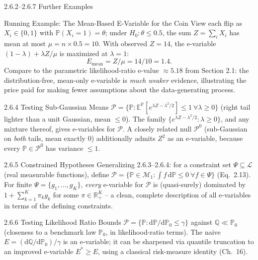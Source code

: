 \documentclass[aspectratio=169,10pt]{beamer}
\newcommand{\PP}{\mathbb{P}}
\newcommand{\QQ}{\mathbb{Q}}
\newcommand{\EE}{\mathbb{E}}
\newcommand{\RR}{\mathbb{R}}
\newcommand{\calP}{\mathcal{P}}
\begin{document}
\begin{frame}[allowframebreaks]{2.6.2--2.6.7 Further Examples}
  \begin{exampleblock}{Running Example: The Mean-Based E-Variable for the Coin}
    View each flip as $X_i\in\{0,1\}$ with $\PP(X_i=1)=\theta$; under
    $H_0:\theta\le0.5$, the sum $Z=\sum_i X_i$ has mean at most
    $\mu = n\times0.5 = 10$. With observed $Z=14$, the e-variable
    $(1-\lambda)+\lambda Z/\mu$ is maximized at $\lambda=1$:
    \[
      E_{\text{mean}} = Z/\mu = 14/10 = 1.4.
    \]
    Compare to the parametric likelihood-ratio e-value $\approx5.18$ from
    Section 2.1: the distribution-free, mean-only e-variable is
    \emph{much weaker} evidence, illustrating the price paid for making
    fewer assumptions about the data-generating process.
  \end{exampleblock}

  \framebreak

  \begin{block}{2.6.4 Testing Sub-Gaussian Means}
    $\calP = \{\PP: \EE^\PP[e^{\lambda Z-\lambda^2/2}]\le1 \ \forall \lambda\ge0\}$
    (right tail lighter than a unit Gaussian, mean $\le0$). The family
    $\{e^{\lambda Z-\lambda^2/2}:\lambda\ge0\}$, and any mixture thereof,
    gives e-variables for $\calP$. A closely related null $\calP^0$
    (sub-Gaussian on \emph{both} tails, mean exactly 0) additionally admits
    $Z^2$ as an e-variable, because every $\PP\in\calP^0$ has variance
    $\le1$.
  \end{block}

  \begin{block}{2.6.5 Constrained Hypotheses}
    Generalizing 2.6.3--2.6.4: for a constraint set $\Psi\subseteq\mathcal{L}$
    (real measurable functions), define
    $\calP = \{\PP\in\mathcal{M}_1: \int f\,\mathrm{d}\PP\le0\ \forall f\in\Psi\}$
    (Eq.~2.13). For finite $\Psi=\{g_1,\ldots,g_K\}$, \emph{every} e-variable
    for $\calP$ is (quasi-surely) dominated by $1+\sum_{k=1}^K \pi_k g_k$ for
    some $\pi\in\RR_+^K$ -- a clean, complete description of all e-variables
    in terms of the defining constraints.
  \end{block}

  \begin{block}{2.6.6 Testing Likelihood Ratio Bounds}
    $\calP=\{\PP: \mathrm{d}\PP/\mathrm{d}\PP_0\le\gamma\}$ against
    $\QQ\ll\PP_0$ (closeness to a benchmark law $\PP_0$, in likelihood-ratio
    terms). The naive $E=(\mathrm{d}\QQ/\mathrm{d}\PP_0)/\gamma$ is an
    e-variable; it can be sharpened via quantile truncation to an improved
    e-variable $E^{*}\ge E$, using a classical risk-measure identity (Ch.~16).
  \end{block}


\end{frame}
\end{document}
